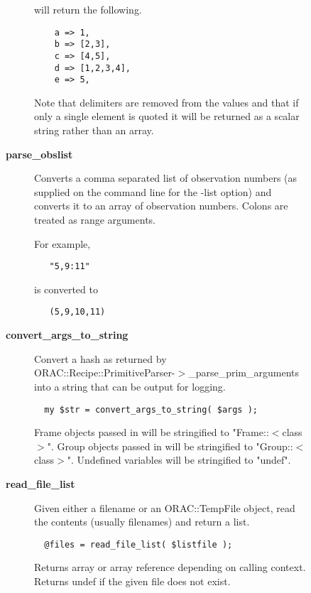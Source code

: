 \begin{description}
\begin{description}
\begin{description}
will return the following.

\begin{verbatim}
    a => 1,
    b => [2,3],
    c => [4,5],
    d => [1,2,3,4],
    e => 5,
\end{verbatim}


Note that delimiters are removed from the values and that if only a
single element is quoted it will be returned as a scalar string rather
than an array.


\item[{\textbf{parse\_obslist}}] \mbox{}

Converts a comma separated list of observation numbers (as supplied
on the command line for the -list option) and converts it to
an array of observation numbers. Colons are treated as range arguments.



For example,

\begin{verbatim}
   "5,9:11"
\end{verbatim}


is converted to

\begin{verbatim}
   (5,9,10,11)
\end{verbatim}

\item[{\textbf{convert\_args\_to\_string}}] \mbox{}

Convert a hash as returned by
ORAC::Recipe::PrimitiveParser-$>$\_parse\_prim\_arguments into a string
that can be output for logging.

\begin{verbatim}
  my $str = convert_args_to_string( $args );
\end{verbatim}


Frame objects passed in will be stringified to "Frame::$<$class$>$". Group
objects passed in will be stringified to "Group::$<$class$>$". Undefined
variables will be stringified to "undef".


\item[{\textbf{read\_file\_list}}] \mbox{}

Given either a filename or an ORAC::TempFile object, read the contents
(usually filenames) and return a list.

\begin{verbatim}
  @files = read_file_list( $listfile );
\end{verbatim}


Returns array or array reference depending on calling context. Returns
undef if the given file does not exist.



\end{description}
\end{description}
\end{description}
